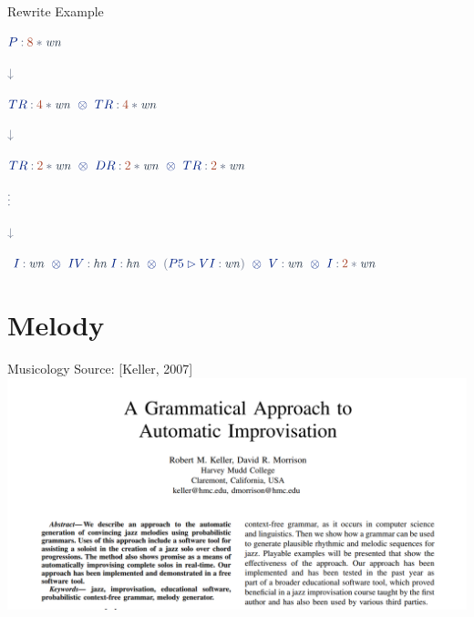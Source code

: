 \documentclass[aspectratio=43]{beamer}
\newcommand*{\mathcolor}{}
\def\mathcolor#1#{\mathcoloraux{#1}}
\newcommand*{\mathcoloraux}[3]{%
  \protect\leavevmode
  \begingroup
    \color#1{#2}#3%
  \endgroup
}
\newcommand{\HSNumeral}[1]{\mathcolor{hsred3}{#1}}
\newcommand{\HSSpecial}[1]{\mathcolor{hsblue4}{\ensuremath{#1}}}
\newcommand{\HSSym}[1]{\mathcolor{hsblue4}{\ensuremath{#1}}}
\newcommand{\HSCon}[1]{\mathcolor{hsblue3}{#1}}
\newcommand{\HSVar}[1]{\mathcolor{hsblue5}{\mathit{\ensuremath{#1}}}}
\begin{document}
\begin{frame}{Rewrite Example}
\centering

\ensuremath{\HSCon{P}\HSSym{\mathbin{:}}\HSNumeral{8}\HSSym{*}\HSVar{wn}}

\pause

\ensuremath{\HSSym{\mathbin{\downarrow}}}

\ensuremath{\HSCon{TR}\HSSym{\mathbin{:}}\HSNumeral{4}\HSSym{*}\HSVar{wn}\HSCon{\mathbin{\ \otimes\ }}\HSCon{TR}\HSSym{\mathbin{:}}\HSNumeral{4}\HSSym{*}\HSVar{wn}}

\pause

\ensuremath{\HSSym{\mathbin{\downarrow}}}

\ensuremath{\HSCon{TR}\HSSym{\mathbin{:}}\HSNumeral{2}\HSSym{*}\HSVar{wn}\HSCon{\mathbin{\ \otimes\ }}\HSCon{DR}\HSSym{\mathbin{:}}\HSNumeral{2}\HSSym{*}\HSVar{wn}\HSCon{\mathbin{\ \otimes\ }}\HSCon{TR}\HSSym{\mathbin{:}}\HSNumeral{2}\HSSym{*}\HSVar{wn}}

\pause

\ensuremath{\HSSym{\vdots}}

\ensuremath{\HSSym{\mathbin{\downarrow}}}

\ensuremath{\HSCon{I}\HSSym{\mathbin{:}}\HSVar{wn}\HSCon{\mathbin{\ \otimes\ }}\HSCon{IV}\HSSym{\mathbin{:}}\HSVar{hn}\;\HSCon{I}\HSSym{\mathbin{:}}\HSVar{hn}\HSCon{\mathbin{\ \otimes\ }}\HSSpecial{(}\HSCon{P5}\HSCon{\mathbin{\vartriangleright}}\HSCon{VI}\HSSym{\mathbin{:}}\HSVar{wn}\HSSpecial{)}\HSCon{\mathbin{\ \otimes\ }}\HSCon{V}\HSSym{\mathbin{:}}\HSVar{wn}\HSCon{\mathbin{\ \otimes\ }}\HSCon{I}\HSSym{\mathbin{:}}\HSNumeral{2}\HSSym{*}\HSVar{wn}}
\end{frame}
\section{Melody}

\begin{frame}{Musicology Source: [Keller, 2007]}
\centering
\includegraphics[keepaspectratio=true,height=.5\paperheight]{source-m.png}
\end{frame}
\end{document}
